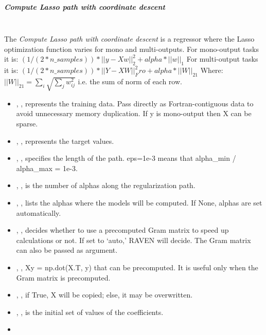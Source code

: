 \subparagraph{Compute Lasso path with coordinate descent}
\mbox{}
\\The \textit{Compute Lasso path with coordinate descent} is a regressor where
the Lasso optimization function varies for mono and multi-outputs.
%
For mono-output tasks it is:
$(1 / (2 * n\_samples)) * ||y - Xw||^2_2 + alpha * ||w||_1$
For multi-output tasks it is:
$(1 / (2 * n\_samples)) * ||Y - XW||^2_Fro + alpha * ||W||_21$
Where:
$||W||_21 = \sum_i \sqrt{\sum_j w_{ij}^2}$
i.e. the sum of norm of each row.
%
\begin{itemize}
  \item {}, , represents the training data.
  Pass directly as Fortran-contiguous data to avoid unnecessary memory
  duplication.
  If y is mono-output then X can be sparse.
  \item {}, , represents the target values.
  \item {}, , specifies the length of
  the path.
  eps=1e-3 means that alpha\_min / alpha\_max = 1e-3.
  \item {}, , is the number of
  alphas along the regularization path.
  \item {}, , lists the alphas
  where the models will be computed.
  If None, alphas are set automatically.
  \item {}, ,
  decides whether to use a precomputed Gram matrix to speed up calculations or
  not.
  If set to `auto,' RAVEN will decide.
  The Gram matrix can also be passed as argument.
  \item {}, ,
  Xy = np.dot(X.T, y) that can be precomputed.
  It is useful only when the Gram matrix is precomputed.
  \item {}, , if True, X will be
  copied; else, it may be overwritten.
  \item {}, , is
  the initial set of values of the coefficients.
  \item \verDescriptionB
\end{itemize}

